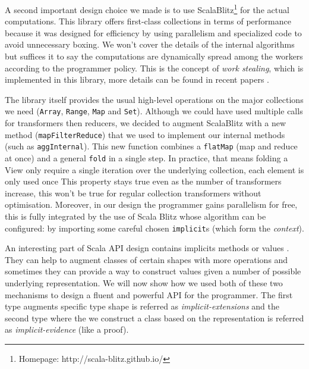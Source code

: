 \documentclass[a4paper,12pt,twocolumn]{article}
\begin{document}
A second important design choice we made is to use ScalaBlitz\footnote{Homepage: http://scala-blitz.github.io/} for the actual computations.
This library offers first-class collections in terms of performance because it was designed for efficiency by using parallelism and specialized code to avoid unnecessary boxing.
We won't cover the details of the internal algorithms but suffices it to say the computations are dynamically spread among the workers according to the programmer policy.
This is the concept of {\it work stealing}, which is implemented in this library, more details can be found in recent papers \cite{scala-parallel}.

The library itself provides the usual high-level operations on the major collections we need (\verb|Array|, \verb|Range|, \verb|Map| and \verb|Set|).
Although we could have used multiple calls for transformers then reducers, we decided to augment ScalaBlitz with a new method (\verb|mapFilterReduce|) that we used to implement our internal methods (such as \verb|aggInternal|).
This new function combines a \verb|flatMap| (map and reduce at once) and a general \verb|fold| in a single step.
In practice, that means folding a View only require a single iteration over the underlying collection, each element is only used once
This property stays true even as the number of transformers increase, this won't be true for regular collection transformers without optimisation.
Moreover, in our design the programmer gains parallelism for free, this is fully integrated by the use of Scala Blitz whose algorithm can be configured: by importing some careful chosen \verb|implicit|s (which form the {\it context}).

An interesting part of Scala API design contains implicits methods or values \cite{scala-implicits}.
They can help to augment classes of certain shapes with more operations and sometimes they can provide a way to construct values given a number of possible underlying representation.
We will now show how we used both of these two mechanisms to design a fluent and powerful API for the programmer.
The first type augments specific type shape is referred as {\it implicit-extensions} and the second type where the we construct a class based on the representation is referred as {\it implicit-evidence} (like a proof).
\end{document}
